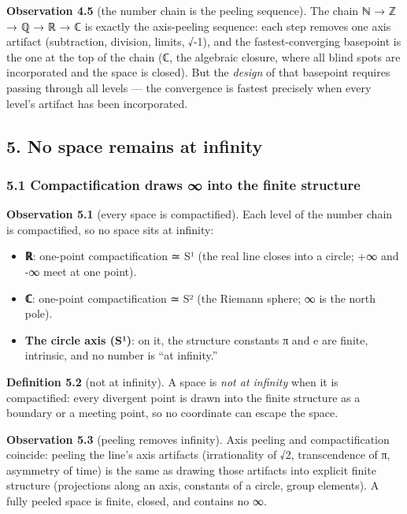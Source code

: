 \documentclass[
]{article}
\providecommand{\tightlist}{%
  \setlength{\itemsep}{0pt}\setlength{\parskip}{0pt}}
\begin{document}
\textbf{Observation 4.5} (the number chain is the peeling sequence). The
chain ℕ → ℤ → ℚ → ℝ → ℂ is exactly the axis-peeling sequence: each step
removes one axis artifact (subtraction, division, limits, √-1), and the
fastest-converging basepoint is the one at the top of the chain (ℂ, the
algebraic closure, where all blind spots are incorporated and the space
is closed). But the \emph{design} of that basepoint requires passing
through all levels --- the convergence is fastest precisely when every
level's artifact has been incorporated.

\subsection{5. No space remains at
infinity}\label{no-space-remains-at-infinity}

\subsubsection{5.1 Compactification draws ∞ into the finite
structure}\label{compactification-draws-into-the-finite-structure}

\textbf{Observation 5.1} (every space is compactified). Each level of
the number chain is compactified, so no space sits at infinity:

\begin{itemize}
\tightlist
\item
  \textbf{ℝ}: one-point compactification ≃ S¹ (the real line closes into
  a circle; +∞ and -∞ meet at one point).
\item
  \textbf{ℂ}: one-point compactification ≃ S² (the Riemann sphere; ∞ is
  the north pole).
\item
  \textbf{The circle axis (S¹)}: on it, the structure constants π and e
  are finite, intrinsic, and no number is ``at infinity.''
\end{itemize}

\textbf{Definition 5.2} (not at infinity). A space is \emph{not at
infinity} when it is compactified: every divergent point is drawn into
the finite structure as a boundary or a meeting point, so no coordinate
can escape the space.

\textbf{Observation 5.3} (peeling removes infinity). Axis peeling and
compactification coincide: peeling the line's axis artifacts
(irrationality of √2, transcendence of π, asymmetry of time) is the same
as drawing those artifacts into explicit finite structure (projections
along an axis, constants of a circle, group elements). A fully peeled
space is finite, closed, and contains no ∞.
\end{document}
